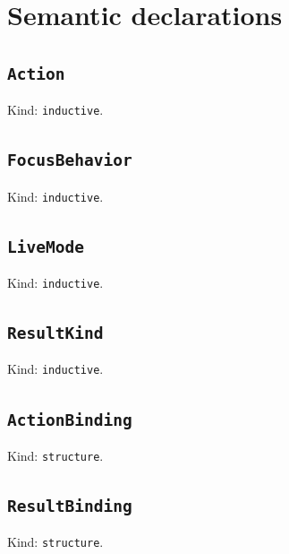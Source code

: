 \documentclass[11pt]{article}
\begin{document}
\section*{Semantic declarations}
\subsection*{\texttt{Action}}
\noindent Kind: \texttt{inductive}.\par
\subsection*{\texttt{FocusBehavior}}
\noindent Kind: \texttt{inductive}.\par
\subsection*{\texttt{LiveMode}}
\noindent Kind: \texttt{inductive}.\par
\subsection*{\texttt{ResultKind}}
\noindent Kind: \texttt{inductive}.\par
\subsection*{\texttt{ActionBinding}}
\noindent Kind: \texttt{structure}.\par
\subsection*{\texttt{ResultBinding}}
\noindent Kind: \texttt{structure}.\par
\end{document}
